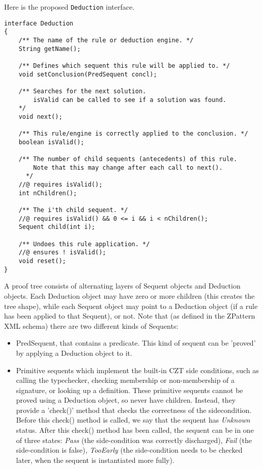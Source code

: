 \documentclass{article}
\begin{document}
\begin{enumerate}
  Here is the proposed \texttt{Deduction} interface.
\begin{verbatim}
interface Deduction
{
    /** The name of the rule or deduction engine. */
    String getName();

    /** Defines which sequent this rule will be applied to. */
    void setConclusion(PredSequent concl);

    /** Searches for the next solution.
        isValid can be called to see if a solution was found.
    */
    void next();

    /** This rule/engine is correctly applied to the conclusion. */
    boolean isValid();

    /** The number of child sequents (antecedents) of this rule.
        Note that this may change after each call to next().
      */
    //@ requires isValid();
    int nChildren();

    /** The i'th child sequent. */
    //@ requires isValid() && 0 <= i && i < nChildren();
    Sequent child(int i);

    /** Undoes this rule application. */
    //@ ensures ! isValid();
    void reset();
}
\end{verbatim}

  A proof tree consists of alternating layers of Sequent objects
  and Deduction objects.  Each Deduction object may have zero or more
  children (this creates the tree shape), while each Sequent object
  may point to a Deduction object (if a rule has been applied to that Sequent),
  or not.  Note that (as defined in the ZPattern XML schema) there
  are two different kinds of Sequents:
  \begin{itemize}
  \item PredSequent, that contains a predicate.  This kind of sequent
    can be 'proved' by applying a Deduction object to it.
    
  \item Primitive sequents which implement the built-in CZT side conditions,
    such as calling the typechecker, checking membership or non-membership
    of a signature, or looking up a definition.  These primitive
    sequents cannot be proved using a Deduction object, so never have
    children.  Instead, they provide a 'check()' method that checks
    the correctness of the sidecondition.  Before this check() method
    is called, we say that the sequent has \emph{Unknown} status.
    After this check() method
    has been called, the sequent can be in one of three states:
    \emph{Pass} (the side-condition was correctly discharged),
    \emph{Fail} (the side-condition is false),
    \emph{TooEarly} (the side-condition needs to be checked later,
    when the sequent is instantiated more fully). 
  \end{itemize}


\end{enumerate}
\end{document}
